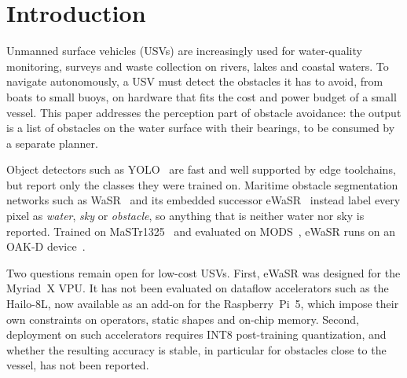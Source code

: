 \documentclass[conference]{IEEEtran}
\begin{document}
\section{Introduction}
Unmanned surface vehicles (USVs) are increasingly used for water-quality monitoring, surveys and waste collection on rivers, lakes and coastal waters. To navigate autonomously, a USV must detect the obstacles it has to avoid, from boats to small buoys, on hardware that fits the cost and power budget of a small vessel. This paper addresses the perception part of obstacle avoidance: the output is a list of obstacles on the water surface with their bearings, to be consumed by a separate planner.

Object detectors such as YOLO~\cite{redmon2016yolo,jocher2023yolov8} are fast and well supported by edge toolchains, but report only the classes they were trained on. Maritime obstacle segmentation networks such as WaSR~\cite{bovcon2022wasr} and its embedded successor eWaSR~\cite{tersek2023ewasr} instead label every pixel as \emph{water}, \emph{sky} or \emph{obstacle}, so anything that is neither water nor sky is reported. Trained on MaSTr1325~\cite{bovcon2019mastr} and evaluated on MODS~\cite{bovcon2022mods}, eWaSR runs on an OAK-D device~\cite{tersek2023ewasr}.

Two questions remain open for low-cost USVs. First, eWaSR was designed for the Myriad~X VPU. It has not been evaluated on dataflow accelerators such as the Hailo-8L, now available as an add-on for the Raspberry~Pi~5, which impose their own constraints on operators, static shapes and on-chip memory. Second, deployment on such accelerators requires INT8 post-training quantization, and whether the resulting accuracy is stable, in particular for obstacles close to the vessel, has not been reported.
\end{document}
